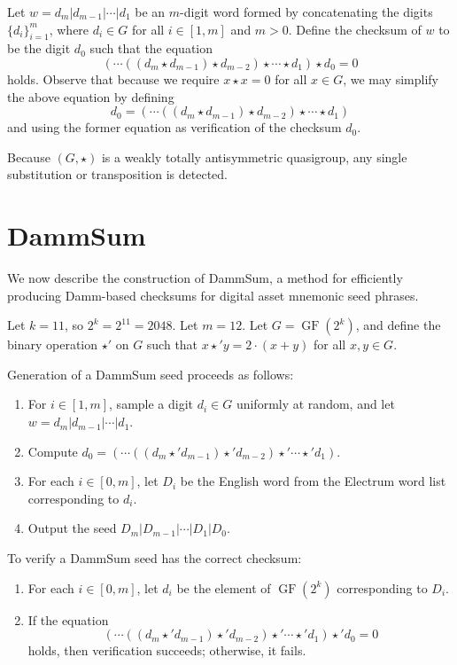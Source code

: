 \documentclass{article}
\theoremstyle{plain}
\theoremstyle{definition}
\newcommand{\GF}{\operatorname{GF}}
\begin{document}
Let $w = d_m | d_{m-1} | \cdots | d_1$ be an $m$-digit word formed by concatenating the digits $\{d_i\}_{i=1}^m$, where $d_i \in G$ for all $i \in [1,m]$ and $m > 0$.
Define the checksum of $w$ to be the digit $d_0$ such that the equation
$$(\cdots((d_m \star d_{m-1}) \star d_{m-2}) \star \cdots \star d_1) \star d_0 = 0$$
holds.
Observe that because we require $x \star x = 0$ for all $x \in G$, we may simplify the above equation by defining 
$$d_0 = (\cdots((d_m \star d_{m-1}) \star d_{m-2}) \star \cdots \star d_1)$$
and using the former equation as verification of the checksum $d_0$.

Because $(G,\star)$ is a weakly totally antisymmetric quasigroup, any single substitution or transposition is detected.


\section{DammSum}

We now describe the construction of DammSum, a method for efficiently producing Damm-based checksums for digital asset mnemonic seed phrases.

Let $k = 11$, so $2^k = 2^{11} = 2048$.
Let $m = 12$.
Let $G = \GF(2^k)$, and define the binary operation $\star'$ on $G$ such that $x \star' y = 2 \cdot (x + y)$ for all $x,y \in G$.

Generation of a DammSum seed proceeds as follows:
\begin{enumerate}
	\item For $i \in [1,m]$, sample a digit $d_i \in G$ uniformly at random, and let $w = d_m | d_{m-1} | \cdots | d_1$.
	\item Compute $d_0 = (\cdots((d_m \star' d_{m-1}) \star' d_{m-2}) \star' \cdots \star' d_1)$.
	\item For each $i \in [0,m]$, let $D_i$ be the English word from the Electrum word list corresponding to $d_i$.
	\item Output the seed $D_m | D_{m-1} | \cdots | D_1 | D_0$.
\end{enumerate}

To verify a DammSum seed has the correct checksum:
\begin{enumerate}
	\item For each $i \in [0,m]$, let $d_i$ be the element of $\GF(2^k)$ corresponding to $D_i$.
	\item If the equation
	$$(\cdots((d_m \star' d_{m-1}) \star' d_{m-2}) \star' \cdots \star' d_1) \star' d_0 = 0$$
	holds, then verification succeeds; otherwise, it fails.
\end{enumerate}
\end{document}
